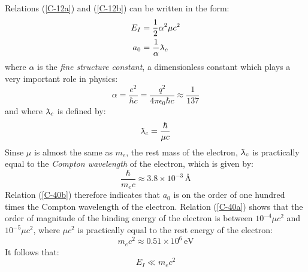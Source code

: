 Relations (\ref{C-12a}) and (\ref{C-12b}) can be written in the form:
\begin{align}
	\label{C-40a}E_I&=\frac{1}{2}\alpha^2\mu c^2\\
	a_0&=\frac{1}{\alpha}\lambdabar_c\label{C-40b}
\end{align}
where $\alpha$ is the \textit{fine structure constant}, a dimensionless constant which plays a very important role in physics:
\begin{equation}\label{C-41}
	\alpha = \frac{e^2}{\hbar c}=\frac{q^2}{4\pi\epsilon_0 \hbar c}\approx\frac{1}{137}
\end{equation}
and where $\lambdabar_c$ is defined by:
\begin{equation}\label{C-42}
	\lambdabar_c = \frac{\hbar}{\mu c}
\end{equation}
Sinse $\mu$ is almost the same as $m_e$, the rest mass of the electron, $\lambdabar_c$ is practically equal to the \textit{Compton wavelength} of the electron, which is given by:
\begin{equation}
	\frac{\hbar}{m_ec}\approx 3.8\times 10^{-3}\, \si{\angstrom}
\end{equation}
Relation (\ref{C-40b}) therefore indicates that $a_0$ is on the order of one hundred times the Compton wavelength of the electron. Relation (\ref{C-40a}) shows that the order of magnitude of the binding energy of the electron is between $10^{-4}\mu c^2$ and $10^{-5}\mu c^2$, where $\mu c^2$ is practically equal to the rest energy of the electron:
\begin{equation}\label{C-44}
	m_ec^2\approx 0.51\times 10^6\, \mbox{eV}
\end{equation}
It follows that:
\begin{equation}\label{C-45}
	E_I\ll m_ec^2
\end{equation}

